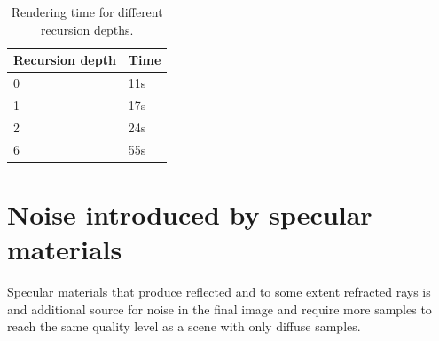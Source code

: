 \documentclass[a4paper, 12pt]{report}
\begin{document}
\begin{table}[h]
\begin{center}
	\begin{tabular}{| l | l |}
		\hline
		Recursion depth & Time \\ \hline
		0 & 11s \\ \hline
		1 & 17s \\ \hline
		2 & 24s \\ \hline
		6 & 55s \\ \hline
	\end{tabular}
	\caption{Rendering time for different recursion depths.}
	\label{tb:recursion}
\end{center}
\end{table}

\section{Noise introduced by specular materials}
Specular materials that produce reflected and to some extent refracted rays is and additional source for noise in the final image and require more samples to reach the same quality level as a scene with only diffuse samples.
\end{document}

